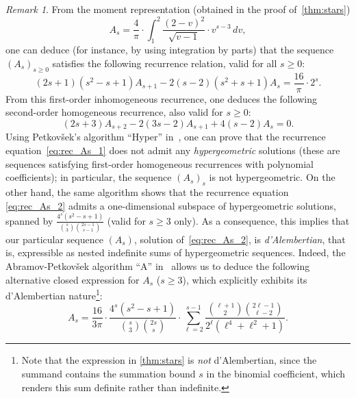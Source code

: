 \documentclass[12pt]{amsart}
\newcommand{\revision}[1]{{#1}}
\theoremstyle{plain}
\theoremstyle{remark}
\newtheorem{remark}[lemma]{Remark}
\begin{document}
\begin{remark}\label{rk:more_As}
From the moment representation \revision{(obtained in the proof of~\cref{thm:stars})}
\[
A_{s}
 =
\frac{4}{\pi}
\cdot \int_{1}^2 \frac{(2-v)^2}{\sqrt{v-1}} \cdot v^{s-3} \, dv ,
\]	
one can deduce \revision{(for instance, by using integration by parts)} that the sequence $(A_s)_{s \geq 0}$ satisfies the following recurrence relation, valid for \revision{all $s\geq 0$}:
\begin{equation}\label{eq:rec_As_1}
(2s+1)(s^2-s+1) A_{s+1} - 2(s-2)(s^2+s+1) A_s = \frac{16}{\pi} \cdot 2^s .
\end{equation}
\revision{From this first-order inhomogeneous recurrence, one deduces the following second-order homogeneous recurrence, also valid for $s\geq 0$: 
}
\begin{equation}\label{eq:rec_As_2}
  (2 s + 3) A_{s+2}
  - 2 (3 s - 2) A_{s+1} 
 + 4 (s - 2) A_s 
 = 0.
 \end{equation}	
\revision{
Using Petkov\v{s}ek's algorithm ``Hyper'' in~\cite[\S4 and \S5.2]{Petkovsek92}, one can prove that the recurrence equation~\eqref{eq:rec_As_1} does not admit any \emph{hypergeometric} solutions (these are sequences satisfying first-order homogeneous recurrences with polynomial coefficients); in particular, the sequence 
$(A_s)_{s}$ is not hypergeometric.
%
On the other hand, the same algorithm shows that the recurrence equation \eqref{eq:rec_As_2} admits a one-dimensional subspace of hypergeometric solutions, spanned by 
 $\frac{4^{s} \left(s^{2}-s +1\right)}{{\binom{s}{3}} {\binom{2 s -1}{s -1}}}$ (valid for $s \geq 3$ only).
As a consequence, this implies that our particular sequence $(A_s)$, solution of~\eqref{eq:rec_As_2}, is \emph{d'Alembertian}, that is, 
expressible as nested indefinite sums of hypergeometric sequences.
Indeed, the Abramov-Petkov\v{s}ek algorithm ``A'' in~\cite[\S3]{AbPe94} allows us to deduce the following alternative closed expression for $A_s$ ($s \geq 3$), which explicitly exhibits its d'Alembertian nature\footnote{\revision{Note that the expression in \cref{thm:stars} is \emph{not} d'Alembertian, since the summand contains the summation bound $s$ in the binomial coefficient, which renders this sum definite rather than indefinite.}}:
\begin{equation}\label{eq:closed_As_3}
A_s = \frac{16}{3 \pi} \cdot \frac{4^s (s^2-s+1)}{\binom{s}{3} \binom{2s}{s}} \cdot 
\sum_{\ell = 2}^{s-1} \frac{\binom{\ell+1}{2} \binom{2\ell-1}{\ell-2}}{2^{\ell} ( \ell^4+\ell^2+1)}.
\end{equation}
} 
\end{remark}	
\end{document}
